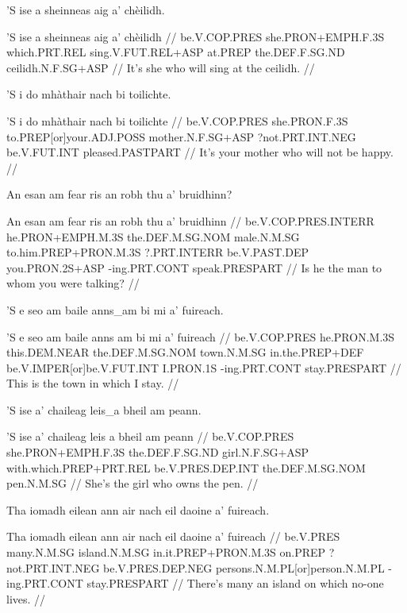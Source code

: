 \documentclass[a4paper,10pt]{article}
\begin{document}
\ex
\begingl
\glpre 'S ise a sheinneas aig a' chèilidh. 

\vspace{4mm}
\gla 'S ise a sheinneas aig a' chèilidh  //
\glb be.V.COP.PRES she.PRON+EMPH.F.3S which.PRT.REL sing.V.FUT.REL+ASP at.PREP the.DEF.F.SG.ND ceilidh.N.F.SG+ASP  //
\glft It's she who will sing at the ceilidh. //
\endgl
\xe

\ex
\begingl
\glpre 'S i do mhàthair nach bi toilichte. 

\vspace{4mm}
\gla 'S i do mhàthair nach bi toilichte  //
\glb be.V.COP.PRES she.PRON.F.3S to.PREP[or]your.ADJ.POSS mother.N.F.SG+ASP ?not.PRT.INT.NEG be.V.FUT.INT pleased.PASTPART  //
\glft It's your mother who will not be happy. //
\endgl
\xe

\ex
\begingl
\glpre An esan am fear ris an robh thu a' bruidhinn? 

\vspace{4mm}
\gla An esan am fear ris an robh thu a' bruidhinn  //
\glb be.V.COP.PRES.INTERR he.PRON+EMPH.M.3S the.DEF.M.SG.NOM male.N.M.SG to.him.PREP+PRON.M.3S ?.PRT.INTERR be.V.PAST.DEP you.PRON.2S+ASP -ing.PRT.CONT speak.PRESPART  //
\glft Is he the man to whom you were talking? //
\endgl
\xe

\ex
\begingl
\glpre 'S e seo am baile anns\_am bi mi a' fuireach. 

\vspace{4mm}
\gla 'S e seo am baile {anns am} bi mi a' fuireach  //
\glb be.V.COP.PRES he.PRON.M.3S this.DEM.NEAR the.DEF.M.SG.NOM town.N.M.SG in.the.PREP+DEF be.V.IMPER[or]be.V.FUT.INT I.PRON.1S -ing.PRT.CONT stay.PRESPART  //
\glft This is the town in which I stay. //
\endgl
\xe

\ex
\begingl
\glpre 'S ise a' chaileag leis\_a bheil am peann. 

\vspace{4mm}
\gla 'S ise a' chaileag {leis a} bheil am peann  //
\glb be.V.COP.PRES she.PRON+EMPH.F.3S the.DEF.F.SG.ND girl.N.F.SG+ASP with.which.PREP+PRT.REL be.V.PRES.DEP.INT the.DEF.M.SG.NOM pen.N.M.SG  //
\glft She's the girl who owns the pen. //
\endgl
\xe

\ex
\begingl
\glpre Tha iomadh eilean ann air nach eil daoine a' fuireach. 

\vspace{4mm}
\gla Tha iomadh eilean ann air nach eil daoine a' fuireach  //
\glb be.V.PRES many.N.M.SG island.N.M.SG in.it.PREP+PRON.M.3S on.PREP ?not.PRT.INT.NEG be.V.PRES.DEP.NEG persons.N.M.PL[or]person.N.M.PL -ing.PRT.CONT stay.PRESPART  //
\glft There's many an island on which no-one lives. //
\endgl
\xe
\end{document}
